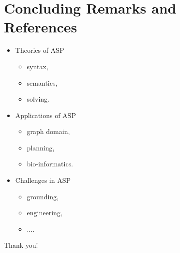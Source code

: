 %

\section{Concluding Remarks and References}

\begin{frame}
\begin{itemize}
  \item Theories of ASP
  \begin{itemize}
    \item syntax,
    \item semantics,
    \item solving.
  \end{itemize}
  \pause
  \item Applications of ASP
  \begin{itemize}
    \item graph domain,
    \item planning,
    \item bio-informatics.
  \end{itemize}
  \pause
  \item Challenges in ASP
    \begin{itemize}
      \item grounding,
      \item engineering,
      \item $\ldots$.
    \end{itemize}
\end{itemize}
\end{frame}

\begin{frame}
 \begin{block}
    {}
  \end{block}
  \pause
  \vspace{2cm}
 \begin{block}
    {}
    \begin{center}
      {\large Thank you!}
    \end{center}
  \end{block}
\end{frame}


